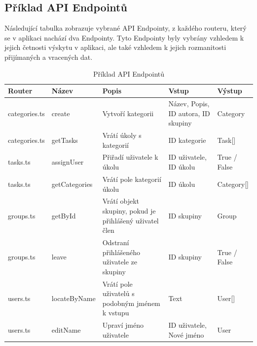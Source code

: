 \subsection{Příklad API Endpointů}

Následující tabulka zobrazuje vybrané API Endpointy, z každého routeru, který se v aplikaci nachází dva Endpointy. Tyto Endpointy byly vybrány vzhledem k jejich četnosti výskytu v aplikaci, ale také vzhledem k jejich rozmanitosti přijímaných a vracených dat.
\begin{table}[hbt!]
    \centering
    \begin{tabularx}{1\textwidth} { 
	| >{\centering\arraybackslash}X 
	| >{\centering\arraybackslash}X 
	| >{\centering\arraybackslash}X 
	| >{\centering\arraybackslash}X 
	| >{\centering\arraybackslash}X | }
	\hline
	\textbf{Router} & \textbf{Název} & \textbf{Popis}                                                  & \textbf{Vstup}                       & \textbf{Výstup} \\
	\hline
	categories.ts   & create          & Vytvoří kategorii                                             & Název, Popis, ID autora, ID skupiny & Category         \\
	\hline
	categories.ts   & getTasks        & Vrátí úkoly s kategorií                                     & ID kategorie                         & Task[]           \\
	\hline
	tasks.ts        & assignUser      & Přiřadí uživatele k úkolu                                  & ID uživatele, ID úkolu             & True / False     \\
	\hline
	tasks.ts        & getCategories   & Vrátí pole kategorií úkolu                                  & ID úkolu                            & Category[]       \\
	\hline
	groups.ts       & getById         & Vrátí objekt skupiny, pokud je přihlášený uživatel člen & ID skupiny                           & Group            \\
	\hline
	groups.ts       & leave           & Odstraní přihlášeného uživatele ze skupiny                & ID skupiny                           & True / False     \\
	\hline
	users.ts        & locateByName    & Vrátí pole uživatelů s podobným jménem k vstupu           & Text                                 & User[]           \\
	\hline
	users.ts        & editName        & Upraví jméno uživatele                                       & ID uživatele, Nové jméno          & User             \\
	\hline
\end{tabularx}
    \caption{Příklad API Endpointů}
    \label{tab:my_label}
\end{table}


